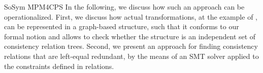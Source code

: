 \begin{copiedFrom}{SoSym MPM4CPS}
In the following, we discuss how such an approach can be operationalized.
First, we discuss how actual transformations, at the example of \qvtr, can be represented in a graph-based structure, such that it conforms to our formal notion and allows to check whether the structure is an independent set of consistency relation trees.
Second, we present an approach for finding consistency relations that are left-equal redundant, by the means of an SMT solver applied to the constraints defined in \qvtr relations.




\end{copiedFrom} %